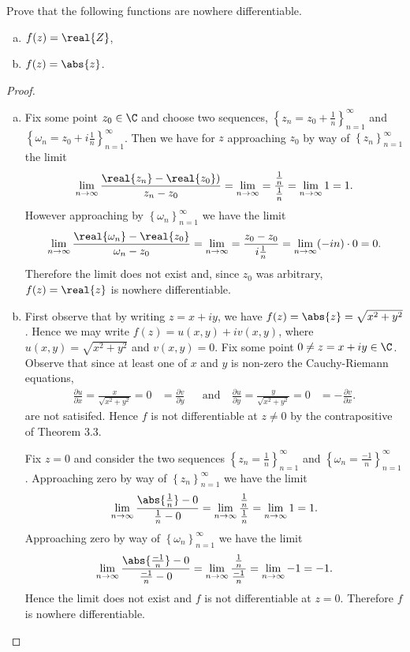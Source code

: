 \documentclass[12pt]{amsart}
\begin{document}
\begin{thm}
  Prove that the following functions are nowhere differentiable.
  \begin{enumerate}[(a)]
    \item
      $f(z) = \real{Z}$,
    \item
      $f(z) = \abs{z}$.
  \end{enumerate}
  \begin{proof}
    \begin{enumerate}[(a)]
    \item
      Fix some point $z_0 \in \C$ and choose two sequences, $\left\{z_n = z_0 + \frac{1}{n}\right\}_{n=1}^\infty$ and $\left\{\omega_n = z_0 + i\frac{1}{n}\right\}_{n=1}^\infty$.
      Then we have for $z$ approaching $z_0$ by way of $\left\{z_n\right\}_{n=1}^\infty$ the limit
      $$\lim_{n \rightarrow \infty} \frac{\real{z_n} - \real{z_0})}{z_n - z_0} = \lim_{n\rightarrow \infty} = \frac{\frac{1}{n}}{\frac{1}{n}} = \lim_{n \rightarrow \infty} 1 = 1.$$
      However approaching by $\left\{\omega_n\right\}_{n=1}^\infty$ we have the limit
      $$\lim_{n \rightarrow \infty} \frac{\real{\omega_n} - \real{z_0}}{\omega_n - z_0} = \lim_{n\rightarrow \infty} = \frac{z_0 - z_0}{i\frac{1}{n}} = \lim_{n \rightarrow \infty} (-in) \cdot 0 = 0.$$
      Therefore the limit does not exist and, since $z_0$ was arbitrary, $f(z) = \real{z}$ is nowhere differentiable.
    \item
      First observe that by writing $z = x + iy$, we have $f(z) = \abs{z} = \sqrt{x^2 + y^2}$.
      Hence we may write $f(z) = u(x,y) + iv(x,y)$, where $u(x,y) = \sqrt{x^2 + y^2}$ and $v(x,y) = 0$.
      Fix some point $0 \neq z = x + iy \in \C$.
      Observe that since at least one of $x$ and $y$ is non-zero the Cauchy-Riemann equations,
      \begin{align*}
        \frac{\partial u}{\partial x} = \frac{x}{\sqrt{x^2 + y^2}} = 0& = \frac{\partial v}{\partial y} &&\text{and}\ & \frac{\partial u}{\partial y} = \frac{y}{\sqrt{x^2 + y^2}} = 0 &= -\frac{\partial v}{\partial x}.
      \end{align*}
      are not satisifed.
      Hence $f$ is not differentiable at $z \neq 0$ by the contrapositive of Theorem 3.3.
      
      Fix $z = 0$ and consider the two sequences $\left\{z_n = \frac{1}{n} \right\}_{n=1}^\infty$ and $\left\{ \omega_n = \frac{-1}{n} \right\}_{n=1}^\infty$.
      Approaching zero by way of $\left\{z_n\right\}_{n=1}^\infty$ we have the limit
      $$\lim_{n \rightarrow \infty} \frac{\abs{\frac{1}{n}} - 0}{\frac{1}{n} - 0} = \lim_{n \rightarrow \infty} \frac{\frac{1}{n}}{\frac{1}{n}} = \lim_{n \rightarrow \infty} 1 = 1.$$
      Approaching zero by way of $\left\{\omega_n\right\}_{n=1}^\infty$ we have the limit
      $$\lim_{n \rightarrow \infty} \frac{\abs{\frac{-1}{n}} - 0}{\frac{-1}{n} - 0} = \lim_{n \rightarrow \infty} \frac{\frac{1}{n}}{\frac{-1}{n}} = \lim_{n \rightarrow \infty} -1 = -1.$$
      Hence the limit does not exist and $f$ is not differentiable at $z = 0$.
      Therefore $f$ is nowhere differentiable.
    \end{enumerate}
  \end{proof}
\end{thm}
\end{document}
